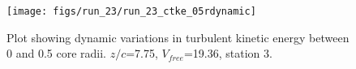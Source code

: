 \begin{figure}[H]
\centering
\texttt{[image: figs/run\_23/run\_23\_ctke\_05rdynamic]}
\caption{Plot showing dynamic variations in turbulent kinetic energy between 0 and 0.5 core radii. $z/c$=7.75, $V_{free}$=19.36, station 3.}
\label{fig:run_23_ctke_05rdynamic}
\end{figure}


